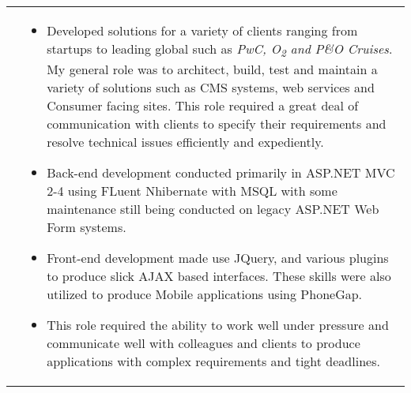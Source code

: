 \documentclass[a4paper,10pt]{article} %
\begin{document}
\begin{tabular}{ L{2cm} | L{11cm}}
&\MPtrue	   

\begin{itemize}[leftmargin=*]
\item Developed solutions for a variety of clients ranging from startups to leading global such as \textit{PwC, O\textsubscript{2} and P\&O Cruises}. My general role was to architect, build, test and maintain a variety of solutions such as CMS systems, web services and Consumer facing sites. This role required a great deal of communication with clients to specify their requirements and resolve technical issues efficiently and expediently.

\item Back-end development conducted primarily in ASP.NET MVC 2-4 using FLuent Nhibernate with MSQL with some maintenance still being conducted on legacy ASP.NET Web Form systems. 

\item Front-end development made use JQuery, and various plugins to produce slick AJAX based interfaces. These skills were also utilized to produce Mobile applications using PhoneGap. 

\item This role required the ability to work well under pressure and communicate well with colleagues and clients to produce applications with complex requirements and tight deadlines.

\end{itemize} \\

%
%
\end{tabular}



\end{document}
